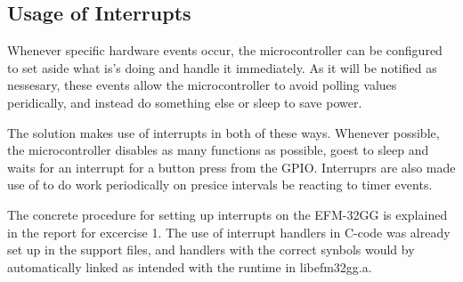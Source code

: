 \subsection{Usage of Interrupts}
Whenever specific hardware events occur, the microcontroller can be configured to set aside what is's doing and handle it immediately.
As it will be notified as nessesary, these events allow the microcontroller to avoid polling values peridically, and instead do something else or sleep to save power.

The solution makes use of interrupts in both of these ways.
Whenever possible, the microcontroller disables as many functions as possible, goest to sleep and waits for an interrupt for a button press from the GPIO.
Interruprs are also made use of to do work periodically on presice intervals be reacting to timer events.

The concrete procedure for setting up interrupts on the EFM-32GG is explained in the report for excercise 1\cite{report}.
The use of interrupt handlers in C-code was already set up in the support files, and handlers with the correct synbols would by automatically linked as intended with the runtime in libefm32gg.a.
